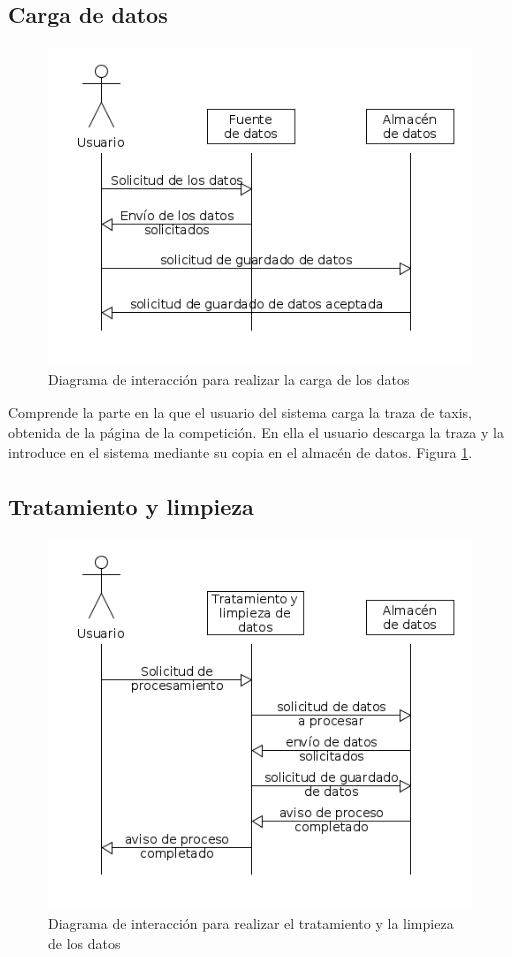 \subsection{Carga de datos}
\begin{figure}[htp!]
\centering
\caption{Diagrama de interacción para realizar la carga de los datos}
\label{fig:cargaDatos}
\includegraphics[scale=0.7]{diagramas/cargaDatos}
\end{figure}

Comprende la parte en la que el usuario del sistema carga la traza de taxis, obtenida de la página de la competición. En ella el usuario descarga la traza y la introduce en el sistema mediante su copia en el almacén de datos. Figura \ref{fig:cargaDatos}.

\subsection{Tratamiento y limpieza}

\begin{figure}[htp!]
\centering
\caption{Diagrama de interacción para realizar el tratamiento y la limpieza de los datos}
\label{fig:procesamientoDatos}
\includegraphics[scale=0.7]{diagramas/procesamientoDatos}
\end{figure}


